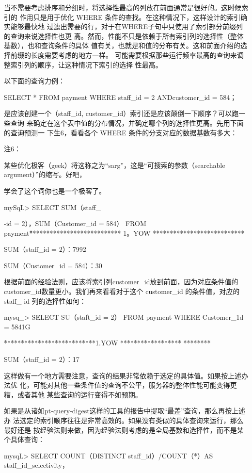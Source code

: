 当不需要考虑排序和分组时，将选择性最高的列放在前面通常是很好的。这时候索引的
作用只是用于优化 WHERE 条件的查找。在这种情况下，这样设计的索引确实能够最快地
过滤出需要的行，对于在WHERE子句中只使用了索引部分前缀列的查询来说选择性也更
高。然而，性能不只是依赖于所有索引列的选择性（整体基数），也和查询条件的具体
值有关，也就是和值的分布有关。这和前面介绍的选择前缀的长度需要考虑的地方一样。
可能需要根据那些运行频率最高的查询来调整索引列的顺序，让这种情况下索引的选择
性最高。

以下面的查询力例：

SELECT * FROM payment WHERE staff\_id = 2 ANDcustomer\_id = 584；

是应该创建一个（staff\_id, customer\_id）索引还是应该颠倒一下顺序？可以跑一些查询
来确定在这个表中值的分布情况，并确定哪个列的选择性更高。先用下面的查询预测一
下生6，看看各个 WHERE 条件的分支对应的数据基数有多大：

注6：

某些优化极客（geek）将这称之为“sarg”，这是“可搜索的参数（searchable argument）”的缩写。好吧，

学会了这个词你也是一个极客了。

mySqL> SELECT SUM（staff\_

-id = 2），SUM（Customer\_id = 584） FROM payment\G

*************************** 1。YOW ***************************

SUM（staff\_id = 2）：7992

SUM（Customer\_id = 584）：30

根据前面的经验法则，应该将索引列customer\_id放到前面，因为对应条件值的
customer\_id数量更小。我们再来看看对于这个 customer\_id 的条件值，对应的staff\_
id 列的选择性如何：

mysq\_> SELECT SU（staft\_id = 2） FROM payment WHERE Customer\_1d = 5841G

***************************1.YOW ****************** ********

SUM（staff\_id = 2）：17

这样做有一个地方需要注意，查询的结果非常依赖于选定的具体值。如果按上述办法优
化，可能对其他一些条件值的查询不公平，服务器的整体性能可能变得更糟，或者其他
某些查询的运行变得不如预期。

如果是从诸如pt-query-digest这样的工具的报告中提取“最差”查询，那么再按上述办
法选定的索引顺序往往是非常高效的。如果没有类似的具体查询来运行，那么最好还是
按经验法则来做，因为经验法则考虑的是全局基数和选择性，而不是某个具体查询：

mysqL> SELECT COUNT（DISTINCT staff\_id）/COUNT（*）AS staff\_id\_selectivity，

